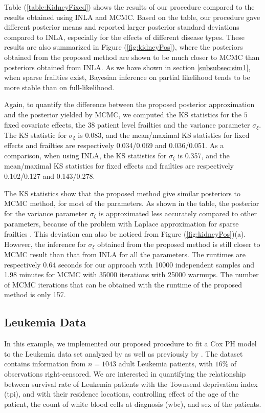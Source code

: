 \documentclass[ba]{imsart}
\begin{document}
Table (\ref{table:KidneyFixed}) shows the results of our procedure compared to the results obtained using INLA and MCMC. Based on the table, our procedure gave different posterior means and reported larger posterior standard deviations compared to INLA, especially for the effects of different disease types. These results are also summarized in Figure (\ref{fig:kidneyPos}), where the posteriors obtained from the proposed method are shown to be much closer to MCMC than posteriors obtained from INLA. As we have shown in section \ref{subsubsec:sim1}, when sparse frailties exist, Bayesian inference on partial likelihood tends to be more stable than on full-likelihood. 

Again, to quantify the difference between the proposed posterior approximation and the posterior yielded by MCMC, we computed the KS statistics for the $5$ fixed covariate effects, the $38$ patient level frailties and the variance parameter $\sigma_\xi$. The KS statistic for $\sigma_\xi$ is 0.083, and the mean/maximal KS statistics for fixed effects and frailties are respectively 0.034/0.069 and 0.036/0.051. 
As a comparison, when using INLA, the KS statistics for $\sigma_\xi$ is 0.357, and the mean/maximal KS statistics for fixed effects and frailties are respectively 0.102/0.127 and 0.143/0.278.

The KS statistics show that the proposed method give similar posteriors to MCMC method, for most of the parameters. As shown in the table, the posterior for the variance parameter $\sigma_\xi$ is approximated less accurately compared to other parameters, because of the problem with Laplace approximation for sparse frailties \citep{Ogden2013ASR}. This deviation can also be noticed from Figure (\ref{fig:kidneyPos})(a). However, the inference for $\sigma_\xi$ obtained from the proposed method is still closer to MCMC result than that from INLA for all the parameters. The runtimes are respectively 0.64 seconds for our approach with 10000 independent samples and 1.98 minutes for MCMC with 35000 iterations with 25000 warmups. The number of MCMC iterations that can be obtained with the runtime of the proposed method is only 157.


\subsection{Leukemia Data}\label{subsec:leuk}

In this example, we implemented our proposed procedure to fit a Cox PH model to the Leukemia data set analyzed by \cite{inlacoxph} as well as previously by \cite{spde,leukaemia}. The dataset contains information from $n=1043$ adult Leukemia patients, with $16\%$ of observations right-censored. We are interested in quantifying the relationship between survival rate of Leukemia patients with the Townsend deprivation index (tpi), and with their residence locations, controlling effect of the age of the patient, the count of white blood cells at diagnosis (wbc), and sex of the patients.
\end{document}
